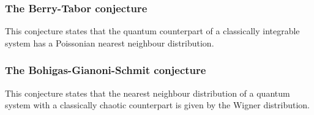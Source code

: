 \documentclass[../thesis.tex]{subfiles}
\theoremstyle{definition}
\begin{document}
\subsubsection{The Berry-Tabor conjecture}%

This conjecture states that the quantum counterpart of a classically integrable
system has a Poissonian nearest neighbour distribution.

\subsubsection{The Bohigas-Gianoni-Schmit conjecture}

This conjecture states that the nearest neighbour distribution of a quantum system
with a classically chaotic counterpart is given by the Wigner distribution.
\end{document}
